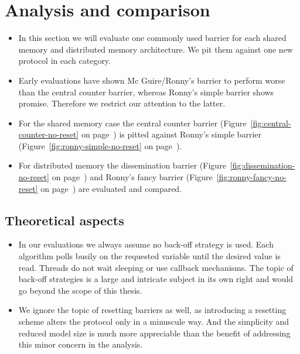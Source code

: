 \documentclass[a4paper, 10pt]{article}
\begin{document}
\section{Analysis and comparison}
\label{sec:analysis}

\begin{itemize}
	\item In this section we will evaluate one commonly used barrier for each shared memory and distributed memory architecture. We pit them against one new protocol in each category.
	\item Early evaluations have shown Mc Guire/Ronny's barrier to perform worse than the central counter barrier, whereas Ronny's simple barrier shows promise. Therefore we restrict our attention to the latter.
	\item For the shared memory case the central counter barrier (Figure~\ref{fig:central-counter-no-reset} on page~\pageref{fig:central-counter-no-reset}) is pitted against Ronny's simple barrier (Figure~\ref{fig:ronny-simple-no-reset} on page~\pageref{fig:ronny-simple-no-reset}).
	\item For distributed memory the dissemination barrier (Figure~\ref{fig:dissemination-no-reset} on page~\pageref{fig:dissemination-no-reset}) and Ronny's fancy barrier (Figure~\ref{fig:ronny-fancy-no-reset} on page~\pageref{fig:ronny-fancy-no-reset}) are evaluated and compared.
\end{itemize}

\subsection{Theoretical aspects}
\begin{itemize}
	\item In our evaluations we always assume no back-off strategy is used. Each algorithm polls busily on the requested variable until the desired value is read. Threads do not wait sleeping or use callback mechanisms. The topic of back-off strategies is a large and intricate subject in its own right and would go beyond the scope of this thesis.
	\item We ignore the topic of resetting barriers as well, as introducing a resetting scheme alters the protocol only in a minuscule way. And the simplicity and reduced model size is much more appreciable than the benefit of addressing this minor concern in the analysis.
\end{itemize}
\end{document}
